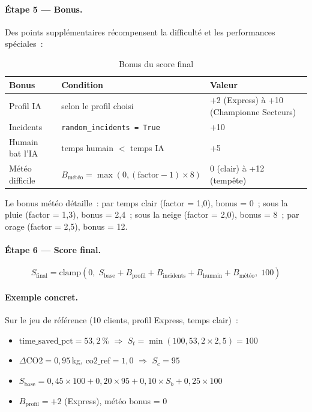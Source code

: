\documentclass[a4paper, 12pt, twoside]{article}
\begin{document}
\paragraph{\'Etape 5 --- Bonus.}
Des points suppl\'{e}mentaires r\'{e}compensent la difficult\'{e} et les performances
sp\'{e}ciales~:
\begin{table}[h]
  \begin{center}
    \begin{tabular}{|p{}|p{}|p{}|}
      \hline
      \textbf{Bonus} & \textbf{Condition} & \textbf{Valeur} \\
      \hline
      Profil IA & selon le profil choisi & +2 (Express) \`{a} +10 (Championne Secteurs) \\
      Incidents & \texttt{random\_incidents = True} & +10 \\
      Humain bat l'IA & temps humain $<$ temps IA & +5 \\
      M\'{e}t\'{e}o difficile & $B_\text{m\'{e}t\'{e}o} = \max(0, (\text{factor}-1)\times 8)$ & 0 (clair) \`{a} +12 (tempête) \\
      \hline
    \end{tabular}
  \end{center}
  \caption{Bonus du score final}
  \label{tab:bonuses}
\end{table}

Le bonus m\'{e}t\'{e}o d\'{e}taille~: par temps clair (factor = 1,0), bonus = 0~; sous la
pluie (factor = 1,3), bonus = 2,4~; sous la neige (factor = 2,0), bonus = 8~; par orage
(factor = 2,5), bonus = 12.

\paragraph{\'Etape 6 --- Score final.}
\[
  S_{\text{final}} = \text{clamp}\!\left(0,\;
    S_{\text{base}} + B_{\text{profil}} + B_{\text{incidents}} + B_{\text{humain}} + B_{\text{m\'{e}t\'{e}o}},\;
    100\right)
\]

\paragraph{Exemple concret.}
Sur le jeu de r\'{e}f\'{e}rence (10 clients, profil Express, temps clair)~:
\begin{itemize}
  \item $\text{time\_saved\_pct} = 53{,}2\,\%$ $\Rightarrow$ $S_t = \min(100, 53{,}2 \times 2{,}5) = 100$
  \item $\Delta\text{CO2} = 0{,}95$\,kg, $\text{co2\_ref} = 1{,}0$ $\Rightarrow$ $S_c = 95$
  \item $S_{\text{base}} = 0{,}45 \times 100 + 0{,}20 \times 95 + 0{,}10 \times S_b + 0{,}25 \times 100$
  \item $B_{\text{profil}} = +2$ (Express), m\'{e}t\'{e}o bonus = 0
\end{itemize}
\end{document}
